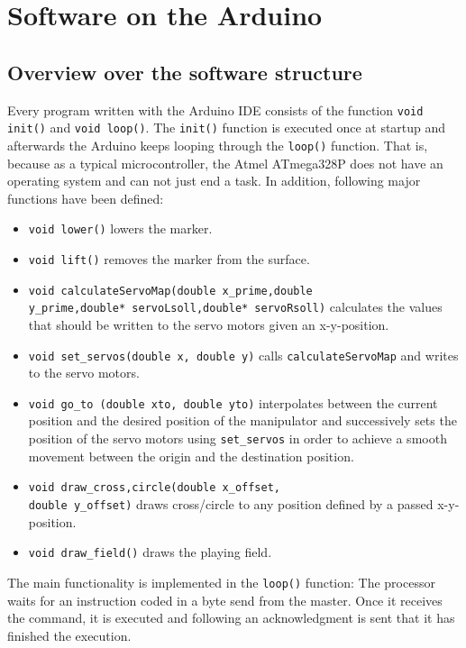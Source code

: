 \documentclass{sig-alternate-05-2015}
\begin{document}
\section{Software on the Arduino}
\subsection{Overview over the software structure}
Every program written with the Arduino IDE consists of the function \texttt{void init()} and \texttt{void loop()}. The \texttt{init()} function is executed once at startup and afterwards the Arduino keeps looping through the \texttt{loop()} function. That is, because as a typical microcontroller, the Atmel ATmega328P does not have an operating system and can not just end a task. In addition, following major functions have been defined:
\begin{itemize}
	\item \texttt{void lower()} lowers the marker.
	\item \texttt{void lift()} removes the marker from the surface.
	\item \texttt{void calculateServoMap(double x_prime,double}\\
	 \texttt{y_prime,double* servoLsoll,double* servoRsoll)}
	 calculates the values that should be written to the servo motors given an x-y-position.
	\item \texttt{void set_servos(double x, double y)} calls \texttt{calculateServoMap} and writes to the servo motors.
	\item  \texttt{void go_to (double xto, double yto)} interpolates between the current position and the desired position of the manipulator and successively sets the position of the servo motors using \texttt{set\_servos} in order to achieve a smooth movement between the origin and the destination position.
	\item \texttt{void draw_{cross,circle}(double x_offset,}\\ \texttt{double y_offset)} draws cross/circle to any position defined by a passed x-y-position.
	\item \texttt{void draw_field()} draws the playing field.
\end{itemize}

The main functionality is implemented in the \texttt{loop()} function: The processor waits for an instruction coded in a byte send from the master. Once it receives the command, it is executed and following an acknowledgment is sent that it has finished the execution.
\end{document}
